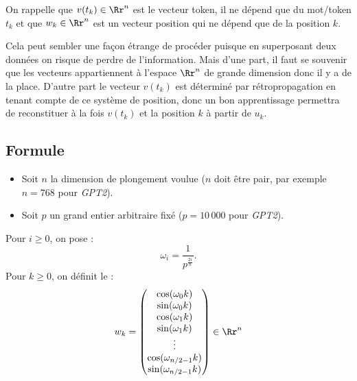 \documentclass[11pt,class=report,crop=false]{standalone}
\begin{document}
On rappelle que $v(t_k) \in \Rr^n$ est le vecteur token, il ne dépend que du mot/token $t_k$ et que $w_k \in \Rr^n$ est un vecteur position qui ne dépend que de la position $k$.

Cela peut sembler une façon étrange de procéder puisque en superposant deux données on risque de perdre de l'information.
Mais d'une part, il faut se souvenir que les vecteurs appartiennent à l'espace $\Rr^n$ de grande dimension donc il y a de la place.
D'autre part le vecteur $v(t_k)$ est déterminé par rétropropagation en tenant compte de ce système de position, donc un bon apprentissage permettra de reconstituer à la fois $v(t_k)$ et la position $k$ à partir de $u_k$.


\subsection{Formule}

\begin{itemize}
	\item Soit $n$ la dimension de plongement voulue ($n$ doit être pair, par exemple $n=768$ pour \emph{GPT2}).
	
	\item Soit $p$ un grand entier arbitraire fixé ($p=10\,000$ pour \emph{GPT2}). 
\end{itemize}

Pour $i \ge 0$, on pose :
$$\omega_i = \frac{1}{p^\frac{2i}{n}}.$$
Pour $k \ge 0$, on définit le  :
\[ w_k = 
\begin{pmatrix}
  \cos(	\omega_0 k ) \\
  \sin(	\omega_0 k ) \\
  \cos(	\omega_1 k ) \\
  \sin(	\omega_1 k ) \\
	\vdots \\
  \cos(	\omega_{n/2-1} k ) \\
  \sin(	\omega_{n/2-1} k ) \\	  
\end{pmatrix}
\in \Rr^n
\]
\end{document}
